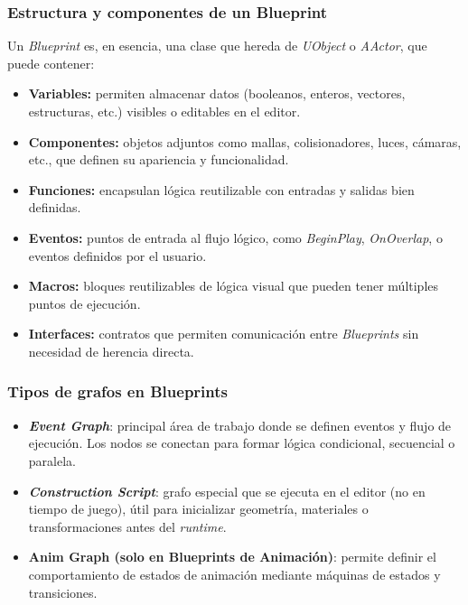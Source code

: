 \subsubsection*{Estructura y componentes de un Blueprint}

Un \textit{Blueprint} es, en esencia, una clase que hereda de \textit{UObject} o \textit{AActor}, que puede contener:

\begin{itemize}
    \item \textbf{Variables:} permiten almacenar datos (booleanos, enteros, vectores, estructuras, etc.) visibles o editables en el editor.
    \item \textbf{Componentes:} objetos adjuntos como mallas, colisionadores, luces, cámaras, etc., que definen su apariencia y funcionalidad.
    \item \textbf{Funciones:} encapsulan lógica reutilizable con entradas y salidas bien definidas.
    \item \textbf{Eventos:} puntos de entrada al flujo lógico, como \textit{BeginPlay}, \textit{OnOverlap}, o eventos definidos por el usuario.
    \item \textbf{Macros:} bloques reutilizables de lógica visual que pueden tener múltiples puntos de ejecución.
    \item \textbf{Interfaces:} contratos que permiten comunicación entre \textit{Blueprints} sin necesidad de herencia directa.
\end{itemize}

\subsubsection*{Tipos de grafos en Blueprints}

\begin{itemize}
    \item \textbf{\textit{Event Graph}}: principal área de trabajo donde se definen eventos y flujo de ejecución. Los nodos se conectan para formar lógica condicional, secuencial o paralela.
    \item \textbf{\textit{Construction Script}}: grafo especial que se ejecuta en el editor (no en tiempo de juego), útil para inicializar geometría, materiales o transformaciones antes del \textit{runtime}.
    \item \textbf{Anim Graph (solo en Blueprints de Animación)}: permite definir el comportamiento de estados de animación mediante máquinas de estados y transiciones.
\end{itemize}

